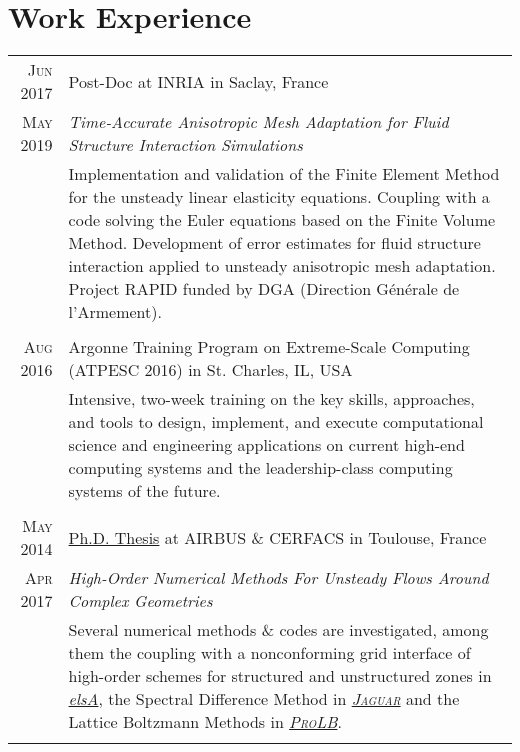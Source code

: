 \documentclass[a4paper,10pt]{article}
\begin{document}
\section{Work Experience}
\begin{tabular}{r|p{15cm}}

\textsc{Jun 2017}   & Post-Doc at \textsc{INRIA} in Saclay, France \\
\textsc{May 2019}   & \emph{Time-Accurate Anisotropic Mesh Adaptation for Fluid Structure Interaction Simulations} \\
                    & \footnotesize{Implementation and validation of the Finite Element Method for the unsteady linear elasticity equations.
                    Coupling with a code solving the Euler equations based on the Finite Volume Method. Development of error estimates
                    for fluid structure interaction applied to unsteady anisotropic mesh adaptation.
                    Project RAPID funded by DGA (Direction G\'en\'erale de l'Armement). } \\
                    \multicolumn{2}{c}{} \\

\textsc{Aug 2016}   & Argonne Training Program on Extreme-Scale Computing (ATPESC 2016) in St. Charles, IL, USA \\
                    & \footnotesize{Intensive, two-week training on the key skills, approaches, and tools 
                    to design, implement, and execute computational science and engineering applications 
                    on current high-end computing systems and the leadership-class computing systems of the future.} \\
                    \multicolumn{2}{c}{} \\

\textsc{May 2014}   & \href{http://pages.saclay.inria.fr/julien.vanharen/files/phd.pdf}{Ph.D. Thesis} at \textsc{AIRBUS} \& \textsc{CERFACS} in Toulouse, France \\
\textsc{Apr 2017}   & \emph{High-Order Numerical Methods For Unsteady Flows Around Complex Geometries} \\
                    & \footnotesize{Several numerical methods \& codes are investigated, among them the coupling with a 
                    nonconforming grid interface of high-order schemes for structured and unstructured 
                    zones in \href{http://elsa.onera.fr}{\emph{elsA}},
                    the Spectral Difference Method in \href{http://www.cerfacs.fr/~puigt/jaguar.html}{\emph{\textsc{Jaguar}}}
                    and the Lattice Boltzmann Methods in \href{http://www.prolb-cfd.com}{\emph{\textsc{ProLB}}}.} \\
                    \multicolumn{2}{c}{} \\


\end{tabular}
\end{document}
